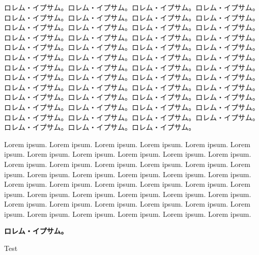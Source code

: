 \documentclass{ltjarticle}
\begin{document}
ロレム・イプサム。ロレム・イプサム。ロレム・イプサム。ロレム・イプサム。ロレム・イプサム。ロレム・イプサム。ロレム・イプサム。ロレム・イプサム。ロレム・イプサム。ロレム・イプサム。ロレム・イプサム。ロレム・イプサム。ロレム・イプサム。ロレム・イプサム。ロレム・イプサム。ロレム・イプサム。ロレム・イプサム。ロレム・イプサム。ロレム・イプサム。ロレム・イプサム。ロレム・イプサム。ロレム・イプサム。ロレム・イプサム。ロレム・イプサム。ロレム・イプサム。ロレム・イプサム。ロレム・イプサム。ロレム・イプサム。ロレム・イプサム。ロレム・イプサム。ロレム・イプサム。ロレム・イプサム。ロレム・イプサム。ロレム・イプサム。ロレム・イプサム。ロレム・イプサム。ロレム・イプサム。ロレム・イプサム。ロレム・イプサム。ロレム・イプサム。ロレム・イプサム。ロレム・イプサム。ロレム・イプサム。ロレム・イプサム。ロレム・イプサム。ロレム・イプサム。ロレム・イプサム。ロレム・イプサム。ロレム・イプサム。ロレム・イプサム。ロレム・イプサム。

Lorem ipsum. Lorem ipsum. Lorem ipsum. Lorem ipsum. Lorem ipsum. Lorem ipsum. Lorem ipsum. Lorem ipsum. Lorem ipsum. Lorem ipsum. Lorem ipsum. Lorem ipsum. Lorem ipsum. Lorem ipsum. Lorem ipsum. Lorem ipsum. Lorem ipsum. Lorem ipsum. Lorem ipsum. Lorem ipsum. Lorem ipsum. Lorem ipsum. Lorem ipsum. Lorem ipsum. Lorem ipsum. Lorem ipsum. Lorem ipsum. Lorem ipsum. Lorem ipsum. Lorem ipsum. Lorem ipsum. Lorem ipsum. Lorem ipsum. Lorem ipsum. Lorem ipsum. Lorem ipsum. Lorem ipsum. Lorem ipsum. Lorem ipsum. Lorem ipsum. Lorem ipsum. Lorem ipsum. Lorem ipsum. Lorem ipsum.

\textbf{ロレム・イプサム。}

Test
\end{document}
